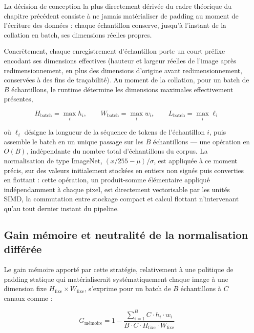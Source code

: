 \documentclass[12pt,a4paper]{report}
\begin{document}
La décision de conception la plus directement dérivée du cadre théorique du chapitre précédent consiste à ne jamais matérialiser de padding au moment de l'écriture des données : chaque échantillon conserve, jusqu'à l'instant de la collation en batch, ses dimensions réelles propres.

Concrètement, chaque enregistrement d'échantillon porte un court préfixe encodant ses dimensions effectives (hauteur et largeur réelles de l'image après redimensionnement, en plus des dimensions d'origine avant redimensionnement, conservées à des fins de traçabilité). Au moment de la collation, pour un batch de $B$ échantillons, le runtime détermine les dimensions maximales effectivement présentes,

\begin{equation}
\label{eq:dims_batch}
H_{\text{batch}} = \max_i h_i, \qquad W_{\text{batch}} = \max_i w_i, \qquad L_{\text{batch}} = \max_i \ell_i
\end{equation}

où $\ell_i$ désigne la longueur de la séquence de tokens de l'échantillon $i$, puis assemble le batch en un unique passage sur les $B$ échantillons — une opération en $O(B)$, indépendante du nombre total d'échantillons du corpus. La normalisation de type ImageNet, $(x/255 - \mu)/\sigma$, est appliquée à ce moment précis, sur des valeurs initialement stockées en entiers non signés puis converties en flottant : cette opération, un produit-somme élémentaire appliqué indépendamment à chaque pixel, est directement vectorisable par les unités SIMD, la commutation entre stockage compact et calcul flottant n'intervenant qu'au tout dernier instant du pipeline.

\subsection{Gain mémoire et neutralité de la normalisation différée}

Le gain mémoire apporté par cette stratégie, relativement à une politique de padding statique qui matérialiserait systématiquement chaque image à une dimension fixe $H_{\text{fixe}} \times W_{\text{fixe}}$, s'exprime pour un batch de $B$ échantillons à $C$ canaux comme :

\begin{equation}
\label{eq:gain_memoire}
G_{\text{mémoire}} = 1 - \frac{\sum_{i=1}^{B} C \cdot h_i \cdot w_i}{B \cdot C \cdot H_{\text{fixe}} \cdot W_{\text{fixe}}}
\end{equation}
\end{document}

